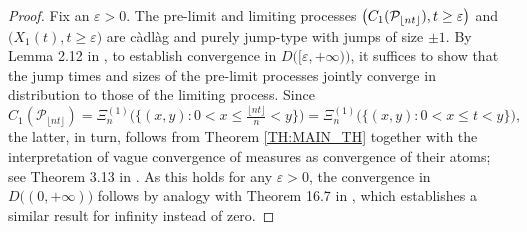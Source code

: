 \documentclass[11pt]{article}
\newcommand{\1}[1][]{
	\ifx&#1&\mathds{1}
	\else\mathds{1}\left\{#1\right\}\fi}
\newcommand{\Pc}{\mathcal{P}}
\newcommand{\eps}{\varepsilon}
\DeclarePairedDelimiter\floor{\lfloor}{\rfloor}
\theoremstyle{definition}
\theoremstyle{remark}
\numberwithin{equation}{section}
\begin{document}
	\begin{proof}
		Fix an $\eps>0$. The pre-limit and limiting processes $\bigl(C_1(\Pc_{\floor{nt}}), t\ge\eps\bigr)$ and
		$\bigl(X_1(t), t\ge\eps\bigr)$ are c\`adl\`ag and purely jump-type with jumps of size $\pm1$.
		By Lemma 2.12 in \cite{X92}, to establish convergence in $D\bigl([\eps,+\infty)\bigr)$,
		it suffices to show that the jump times and sizes of the pre-limit processes jointly converge
		in distribution to those of the limiting process. Since
		\begin{equation*}
			C_1(\Pc_{\lfloor nt\rfloor})
				=\Xi_n^{(1)}\bigl(\{(x,y):0<x\le\tfrac{\lfloor nt\rfloor}n<y\}\bigr)
				=\Xi_n^{(1)}\bigl(\{(x,y):0<x\le t<y\}\bigr),
		\end{equation*}
		the latter, in turn, follows from Theorem \ref{TH:MAIN_TH} together with the interpretation of vague convergence of measures as convergence of their atoms; see Theorem 3.13 in \cite{R87}.
		As this holds for any $\eps>0$, the convergence in $D\bigl((0,+\infty)\bigr)$ follows by analogy
		with Theorem 16.7 in \cite{B99}, which establishes a similar result for infinity instead of zero.
		

\end{proof}
\end{document}
